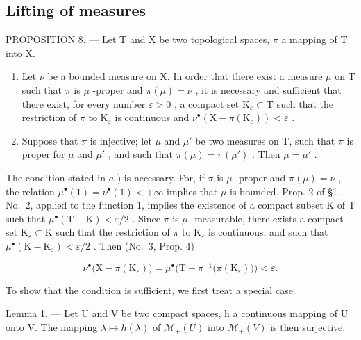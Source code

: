 \subsection{Lifting of measures}

PROPOSITION 8. --- Let T and X be two topological spaces, \(\pi\) a mapping of T into X.

\begin{enumerate}
\def\labelenumi{\alph{enumi})}
\item
  Let \(\nu\) be a bounded measure on X. In order that there exist a measure \(\mu\) on T such that \(\pi\) is \(\mu\) -proper and \(\pi(\mu) = \nu\) , it is necessary and sufficient that there exist, for every number \(\varepsilon > 0\) , a compact set \(\mathrm{K}_{\varepsilon} \subset \mathrm{T}\) such that the restriction of \(\pi\) to \(\mathrm{K}_{\varepsilon}\) is continuous and \(\nu^{\bullet}(\mathrm{X} - \pi(\mathrm{K}_{\varepsilon})) < \varepsilon\) .
\item
  Suppose that \(\pi\) is injective; let \(\mu\) and \(\mu'\) be two measures on T, such that \(\pi\) is proper for \(\mu\) and \(\mu'\) , and such that \(\pi(\mu) = \pi(\mu')\) . Then \(\mu = \mu'\) .
\end{enumerate}

The condition stated in \(a\) ) is necessary. For, if \(\pi\) is \(\mu\) -proper and \(\pi(\mu) = \nu\) , the relation \(\mu^{\bullet}(1) = \nu^{\bullet}(1) < +\infty\) implies that \(\mu\) is bounded. Prop. 2 of §1, No.~2, applied to the function 1, implies the existence of a compact subset K of T such that \(\mu^{\bullet}(\mathrm{T} - \mathrm{K}) < \varepsilon/2\) . Since \(\pi\) is \(\mu\) -measurable, there exists a compact set \(\mathrm{K}_{\varepsilon} \subset \mathrm{K}\) such that the restriction of \(\pi\) to \(\mathrm{K}_{\varepsilon}\) is continuous, and such that \(\mu^{\bullet}(\mathrm{K} - \mathrm{K}_{\varepsilon}) < \varepsilon/2\) . Then (No.~3, Prop. 4)

\[
\nu^ {\bullet} \big (\mathrm{X} - \pi (\mathrm{K} _ {\varepsilon}) \big) = \mu^ {\bullet} \big (\mathrm{T} - \pi^{-1} \big (\pi (\mathrm{K} _ {\varepsilon}) \big) \big) <   \varepsilon .
\]

To show that the condition is sufficient, we first treat a special case.

Lemma 1. --- Let U and V be two compact spaces, h a continuous mapping of U onto V. The mapping \(\lambda \mapsto h(\lambda)\) of \(\mathcal{M}_{+}(U)\) into \(\mathcal{M}_{+}(V)\) is then surjective.

